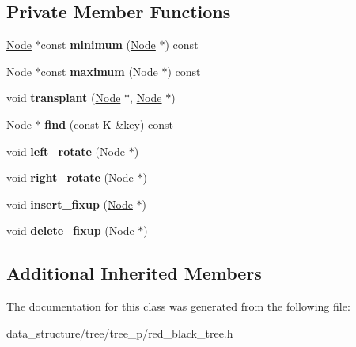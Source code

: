\subsection*{Private Member Functions}
\begin{DoxyCompactItemize}
\item 
\mbox{\label{classRedBlackTree_a6a3c5b202fdaee39152a185c6fc4a3c0}} 
\hyperlink{structRBTreeNode}{Node} $\ast$const {\bfseries minimum} (\hyperlink{structRBTreeNode}{Node} $\ast$) const
\item 
\mbox{\label{classRedBlackTree_a95ada18cc67ea0bcdd25b816dcf8cd4e}} 
\hyperlink{structRBTreeNode}{Node} $\ast$const {\bfseries maximum} (\hyperlink{structRBTreeNode}{Node} $\ast$) const
\item 
\mbox{\label{classRedBlackTree_a06dce17014728689d32e4e0cbbce3685}} 
void {\bfseries transplant} (\hyperlink{structRBTreeNode}{Node} $\ast$, \hyperlink{structRBTreeNode}{Node} $\ast$)
\item 
\mbox{\label{classRedBlackTree_a15b709e0fe1adf23f6adb22f17401013}} 
\hyperlink{structRBTreeNode}{Node} $\ast$ {\bfseries find} (const K \&key) const
\item 
\mbox{\label{classRedBlackTree_a014683afc23d8cb321cb44b4edc442a4}} 
void {\bfseries left\+\_\+rotate} (\hyperlink{structRBTreeNode}{Node} $\ast$)
\item 
\mbox{\label{classRedBlackTree_a7f9850af2258827381214b5eb46b3ebb}} 
void {\bfseries right\+\_\+rotate} (\hyperlink{structRBTreeNode}{Node} $\ast$)
\item 
\mbox{\label{classRedBlackTree_a245c2d25489e65d31df086af17fabbc0}} 
void {\bfseries insert\+\_\+fixup} (\hyperlink{structRBTreeNode}{Node} $\ast$)
\item 
\mbox{\label{classRedBlackTree_a9d70e240c81ba402cce60b04fed92309}} 
void {\bfseries delete\+\_\+fixup} (\hyperlink{structRBTreeNode}{Node} $\ast$)
\end{DoxyCompactItemize}
\subsection*{Additional Inherited Members}


The documentation for this class was generated from the following file\+:\begin{DoxyCompactItemize}
\item 
data\+\_\+structure/tree/tree\+\_\+p/red\+\_\+black\+\_\+tree.\+h\end{DoxyCompactItemize}
